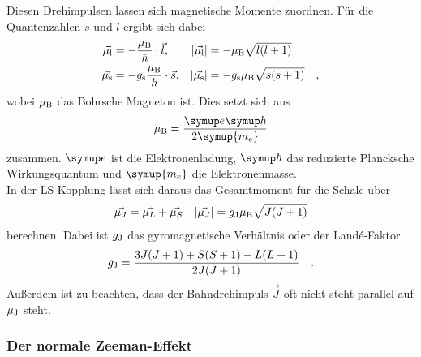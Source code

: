 \noindent
Diesen Drehimpulsen lassen sich magnetische Momente zuordnen. Für die Quantenzahlen $s$ und $l$ ergibt sich dabei 
\begin{align*}
    \vec{\mu_{\text{l}}} &= - \frac{\mu_\text{B}}{\hbar} \cdot \vec{l}, & |\vec{\mu_{\text{l}}}|& = - \mu_\text{B} \sqrt{l(l+1)}\\
    \vec{\mu_{\text{s}}} &= - g_{\text{s}} \frac{\mu_\text{B}}{\hbar} \cdot \vec{s}, & |\vec{\mu_{\text{s}}}| &= - g_{\text{s}} \mu_\text{B} \sqrt{s(s+1)} \quad ,
\end{align*}
wobei $\mu_{\text{B}}$ das Bohrsche Magneton ist.
Dies setzt sich aus 
\begin{equation*}
    \mu_\t{B} = \frac{\symup e \symup \hbar}{2\symup{m_e}}
\end{equation*}
zusammen. $\symup e$  ist die Elektronenladung\cite{e0}, $\symup \hbar$ das reduzierte Plancksche Wirkungsquantum\cite{Planck} und $\symup{m_e}$ die Elektronenmasse\cite{m0}.\\
In der LS-Kopplung lässt sich daraus das Gesamtmoment für die Schale über
\begin{align}
    \vec{\mu_J} &= \vec{\mu_L} + \vec{\mu_S} & |\vec{\mu_J}| = g_{\text{J}} \mu_\text{B} \sqrt{J(J+1)} 
\end{align}
berechnen. Dabei ist $g_{\text{J}} $ das gyromagnetische Verhältnis oder der Landé-Faktor 
\begin{equation}
    g_{\text{J}} = \frac{3J(J+1) + S(S+1) - L(L+1)}{2J(J+1)} \quad .
    \label{eqn:lande}
\end{equation}
Außerdem ist zu beachten, dass der Bahndrehimpuls $ \vec J$ oft nicht steht parallel auf $\mu_{\text{J}}$ steht.

\subsubsection{Der normale Zeeman-Effekt}

